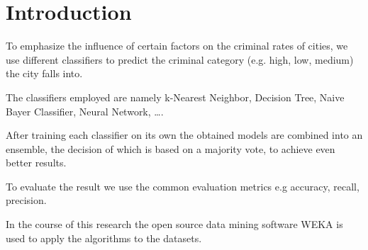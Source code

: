 \section{Introduction}

To emphasize the influence of certain factors on the criminal rates of cities, we use different classifiers to predict the criminal category (e.g. high, low, medium) the city falls into. 

The classifiers employed are namely k-Nearest Neighbor, Decision Tree, Naive Bayer Classifier, Neural Network, \ldots. 

After training each classifier on its own the obtained models are combined into an ensemble, the decision of which is based on a majority vote, to achieve even better results. 

To evaluate the result we use the common evaluation metrics  e.g accuracy, recall, precision.

In the course of this research the open source data mining software WEKA is used to apply the algorithms to the datasets.
